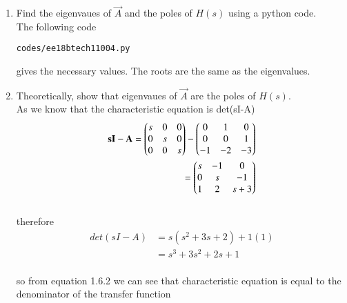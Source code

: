 \begin{enumerate}[label=\thesection.\arabic*.,ref=\thesection.\theenumi]
\item Find the eigenvaues of $\vec{A}$ and the poles of $H(s)$ using a python code.
\\
\solution The following code 
%
\begin{lstlisting}
codes/ee18btech11004.py
\end{lstlisting}
gives the necessary values.  The roots are the same as the eigenvalues.
%
\item Theoretically, show that eigenvaues of $\vec{A}$ are the poles of  $H(s)$.\\
\solution 
As we know that  the characteristic equation is det(sI-A) 
\\\begin{align}
\mathbf{sI-A}=
\begin{pmatrix}s&0&0\\0&s&0\\0&0&s\end{pmatrix}
-
\begin{pmatrix}0&1&0\\0&0&1\\-1&-2&-3\end{pmatrix}\\
=\begin{pmatrix}s&-1&0\\0&s&-1\\1&2&s+3\end{pmatrix}
\end{align}
\\therefore
\begin{align}
det(sI-A)&=s(s^2+3s+2)+1(1)\\
&=s^3+3s^2+2s+1
\end{align} 
\\so from equation 1.6.2 we can see that characteristic equation is equal to the denominator of the transfer function
\end{enumerate}

